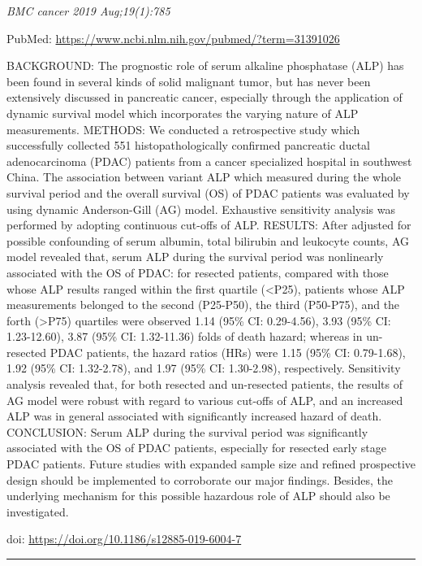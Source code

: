 \documentclass[]{article}
\begin{document}
\emph{BMC cancer 2019 Aug;19(1):785}

PubMed: \url{https://www.ncbi.nlm.nih.gov/pubmed/?term=31391026}

BACKGROUND: The prognostic role of serum alkaline phosphatase (ALP) has
been found in several kinds of solid malignant tumor, but has never been
extensively discussed in pancreatic cancer, especially through the
application of dynamic survival model which incorporates the varying
nature of ALP measurements. METHODS: We conducted a retrospective study
which successfully collected 551 histopathologically confirmed
pancreatic ductal adenocarcinoma (PDAC) patients from a cancer
specialized hospital in southwest China. The association between variant
ALP which measured during the whole survival period and the overall
survival (OS) of PDAC patients was evaluated by using dynamic
Anderson-Gill (AG) model. Exhaustive sensitivity analysis was performed
by adopting continuous cut-offs of ALP. RESULTS: After adjusted for
possible confounding of serum albumin, total bilirubin and leukocyte
counts, AG model revealed that, serum ALP during the survival period was
nonlinearly associated with the OS of PDAC: for resected patients,
compared with those whose ALP results ranged within the first quartile
(\textless{}P25), patients whose ALP measurements belonged to the second
(P25-P50), the third (P50-P75), and the forth (\textgreater{}P75)
quartiles were observed 1.14 (95\% CI: 0.29-4.56), 3.93 (95\% CI:
1.23-12.60), 3.87 (95\% CI: 1.32-11.36) folds of death hazard; whereas
in un-resected PDAC patients, the hazard ratios (HRs) were 1.15 (95\%
CI: 0.79-1.68), 1.92 (95\% CI: 1.32-2.78), and 1.97 (95\% CI:
1.30-2.98), respectively. Sensitivity analysis revealed that, for both
resected and un-resected patients, the results of AG model were robust
with regard to various cut-offs of ALP, and an increased ALP was in
general associated with significantly increased hazard of death.
CONCLUSION: Serum ALP during the survival period was significantly
associated with the OS of PDAC patients, especially for resected early
stage PDAC patients. Future studies with expanded sample size and
refined prospective design should be implemented to corroborate our
major findings. Besides, the underlying mechanism for this possible
hazardous role of ALP should also be investigated.

doi: \url{https://doi.org/10.1186/s12885-019-6004-7}

{}

{}

\begin{center}\rule{0.5\linewidth}{\linethickness}\end{center}
\end{document}

